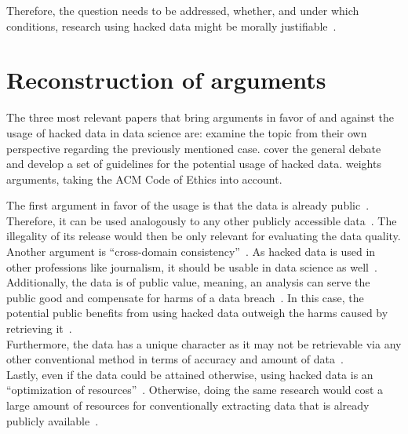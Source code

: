 Therefore, the question needs to be addressed, whether, and under which conditions, research using hacked data might be morally justifiable~\parencite[][745]{nature}.

\section*{Reconstruction of arguments}

The three most relevant papers that bring arguments in favor of and against the usage of hacked data in data science are:
\textcite{patreon} examine the topic from their own perspective regarding the previously mentioned case.
\textcite{nature} cover the general debate and develop a set of guidelines for the potential usage of hacked data.
\textcite{acm} weights arguments, taking the ACM Code of Ethics into account.

The first argument in favor of the usage is that the data is already public~\parencite[][5]{patreon}.
Therefore, it can be used analogously to any other publicly accessible data~\parencite[][23]{acm}.
The illegality of its release would then be only relevant for evaluating the data quality.\\
Another argument is ``cross-domain consistency''~\parencite[][746]{nature}.
As hacked data is used in other professions like journalism, it should be usable in data science as well~\parencite[][745]{nature}.\\
Additionally, the data is of public value, meaning, an analysis can serve the public good and compensate for harms of a data breach~\parencites[][5]{patreon}[][23]{acm}.
In this case, the potential public benefits from using hacked data outweigh the harms caused by retrieving it~\parencite[][23]{acm}.\\
Furthermore, the data has a unique character as it may not be retrievable via any other conventional method in terms of accuracy and amount of data~\parencites[][745]{nature}[][5]{patreon}.\\
Lastly, even if the data could be attained otherwise, using hacked data is an ``optimization of resources''~\parencite[][746]{nature}.
Otherwise, doing the same research would cost a large amount of resources for conventionally extracting data that is already publicly available~\parencite[][745]{nature}.

